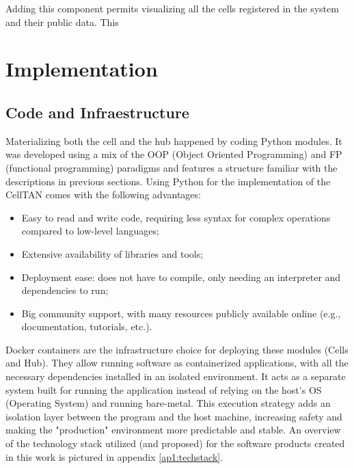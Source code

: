 Adding this component permits visualizing all the cells registered in the system and their public data. This 

\section{Implementation}

\subsection{Code and Infraestructure}

Materializing both the cell and the hub happened by coding Python modules. It was developed using a mix of the OOP (Object Oriented Programming) and FP (functional programming) paradigms and features a structure familiar with the descriptions in previous sections. Using Python for the implementation of the CellTAN comes with the following advantages:

\begin{itemize}
    \item Easy to read and write code, requiring less syntax for complex operations compared to low-level languages;
    \item Extensive availability of libraries and tools;
    \item Deployment ease: does not have to compile, only needing an interpreter and dependencies to run;
    \item Big community support, with many resources publicly available online (e.g., documentation, tutorials, etc.). 
\end{itemize}


Docker containers \cite{docker} are the infrastructure choice for deploying these modules (Cells and Hub). They allow running software as containerized applications, with all the necessary dependencies installed in an isolated environment. It acts as a separate system built for running the application instead of relying on the host's OS (Operating System) and running bare-metal. This execution strategy adds an isolation layer between the program and the host machine, increasing safety and making the "production" environment more predictable and stable. An overview of the technology stack utilized (and proposed) for the software products created in this work is pictured in appendix \ref{ap1:techstack}.


